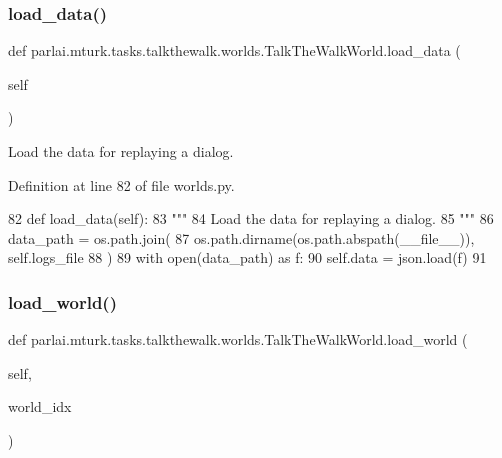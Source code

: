 \subsubsection{\texorpdfstring{load\+\_\+data()}{load\_data()}}
{\footnotesize\ttfamily def parlai.\+mturk.\+tasks.\+talkthewalk.\+worlds.\+Talk\+The\+Walk\+World.\+load\+\_\+data (\begin{DoxyParamCaption}\item[{}]{self }\end{DoxyParamCaption})}

\begin{DoxyVerb}Load the data for replaying a dialog.
\end{DoxyVerb}
 

Definition at line 82 of file worlds.\+py.


\begin{DoxyCode}
82     \textcolor{keyword}{def }load\_data(self):
83         \textcolor{stringliteral}{"""}
84 \textcolor{stringliteral}{        Load the data for replaying a dialog.}
85 \textcolor{stringliteral}{        """}
86         data\_path = os.path.join(
87             os.path.dirname(os.path.abspath(\_\_file\_\_)), self.logs\_file
88         )
89         with open(data\_path) \textcolor{keyword}{as} f:
90             self.data = json.load(f)
91 
\end{DoxyCode}
\mbox{\label{classparlai_1_1mturk_1_1tasks_1_1talkthewalk_1_1worlds_1_1TalkTheWalkWorld_aed8d5a0a3e3457f2334b33726912586c}} 
\subsubsection{\texorpdfstring{load\+\_\+world()}{load\_world()}}
{\footnotesize\ttfamily def parlai.\+mturk.\+tasks.\+talkthewalk.\+worlds.\+Talk\+The\+Walk\+World.\+load\+\_\+world (\begin{DoxyParamCaption}\item[{}]{self,  }\item[{}]{world\+\_\+idx }\end{DoxyParamCaption})}

